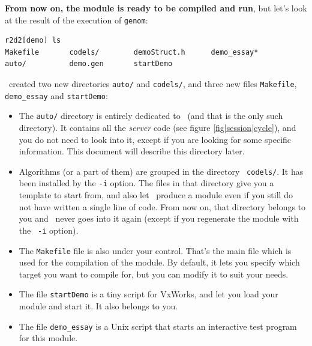 {\bf From now on, the module is ready to  be compiled and run}, but let's
look at the result of the execution of {\tt genom}:

\begin{center}
\begin{cartouche}\small
\begin{verbatim}
r2d2[demo] ls
Makefile       codels/        demoStruct.h      demo_essay*
auto/          demo.gen       startDemo
\end{verbatim}
\end{cartouche}
\end{center}

\bigbreak
\GenoM\ created two new directories {\tt auto/} and {\tt codels/}, and three
new files {\tt Makefile}, {\tt demo\_essay} and {\tt startDemo}:

\begin{itemize}
   \item The {\tt auto/} directory  is entirely dedicated to \GenoM\ (and
   that is the only  such directory).  It contains  all the  {\em server}
   code (see figure \ref{fig|session|cycle}), and you do not need to look
   into it, except if you are looking for some specific information. This
   document will describe this directory later.

   \item Algorithms (or a part of them) are grouped in the directory {\tt
   codels/}. It has been  installed by the  {\tt -i} option. The files in
   that directory give you a template to start from, and also let \GenoM\
   produce a module even if you still do not have written a single line of
   code. From now  on,  that directory belongs to  you  and \GenoM\ never
   goes into it again (except if you regenerate  the module with the {\tt
   -i} option).

   \item The  {\tt Makefile} file is  also under your control. That's the
   main file which is used for the compilation of the module. By default,
   it lets you specify which target you want to compile  for, but you can
   modify it to suit your needs.

   \item The  file {\tt startDemo} is a  tiny script for VxWorks, and let
   you load your module and start it. It also belongs to you.

   \item The  file  {\tt demo\_essay}  is a Unix  script that   starts an
   interactive test program for this module.
\end{itemize}


